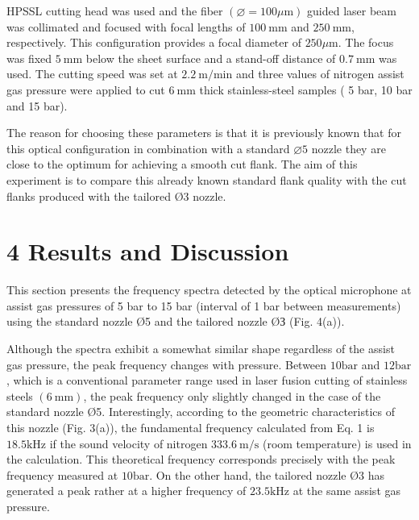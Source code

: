 \documentclass[10pt]{article}
\begin{document}
HPSSL cutting head was used and the fiber $(\varnothing=100 \mu \mathrm{m})$ guided laser beam was collimated and focused with focal lengths of $100 \mathrm{~mm}$ and $250 \mathrm{~mm}$, respectively. This configuration provides a focal diameter of $250 \mu \mathrm{m}$. The focus was fixed $5 \mathrm{~mm}$ below the sheet surface and a stand-off distance of $0.7 \mathrm{~mm}$ was used. The cutting speed was set at $2.2 \mathrm{~m} / \mathrm{min}$ and three values of nitrogen assist gas pressure were applied to cut $6 \mathrm{~mm}$ thick stainless-steel samples ( 5 bar, 10 bar and 15 bar).

The reason for choosing these parameters is that it is previously known that for this optical configuration in combination with a standard $\varnothing 5$ nozzle they are close to the optimum for achieving a smooth cut flank. The aim of this experiment is to compare this already known standard flank quality with the cut flanks produced with the tailored $Ø 3$ nozzle.

\section*{4 Results and Discussion}
This section presents the frequency spectra detected by the optical microphone at assist gas pressures of 5 bar to 15 bar (interval of 1 bar between measurements) using the standard nozzle Ø5 and the tailored nozzle ØЗ (Fig. 4(a)).

Although the spectra exhibit a somewhat similar shape regardless of the assist gas pressure, the peak frequency changes with pressure. Between $10 \mathrm{bar}$ and $12 \mathrm{bar}$, which is a conventional parameter range used in laser fusion cutting of stainless steels $(6 \mathrm{~mm})$, the peak frequency only slightly changed in the case of the standard nozzle Ø5. Interestingly, according to the geometric characteristics of this nozzle (Fig. 3(a)), the fundamental frequency calculated from Eq. 1 is $18.5 \mathrm{kHz}$ if the sound velocity of nitrogen $333.6 \mathrm{~m} / \mathrm{s}$ (room temperature) is used in the calculation. This theoretical frequency corresponds precisely with the peak frequency measured at $10 \mathrm{bar}$. On the other hand, the tailored nozzle $Ø 3$ has generated a peak rather at a higher frequency of $23.5 \mathrm{kHz}$ at the same assist gas pressure.
\end{document}

